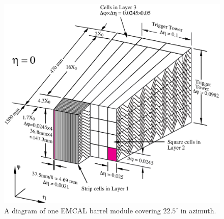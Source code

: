 \begin{figure}[ht]
\centering
\includegraphics[width=.8\textwidth]{figures/atlas/emcal_barrel_module.eps}
\caption{ A diagram of one EMCAL barrel module 
covering $22.5^{\circ}$ in azimuth.}
\label{fig:atlas_emcal_module}
\end{figure}

